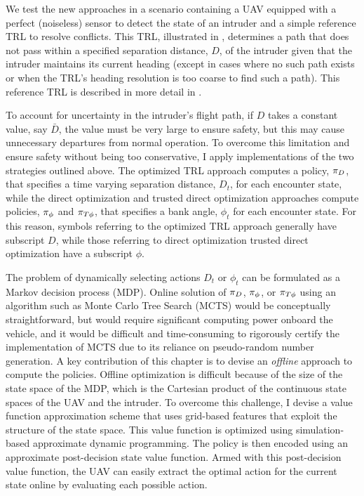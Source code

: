 We test the new approaches in a scenario containing a UAV equipped with a perfect (noiseless) sensor to detect the state of an intruder and a simple reference TRL to resolve conflicts. This TRL, illustrated in , determines a path that does not pass within a specified separation distance, $D$, of the intruder given that the intruder maintains its current heading (except in cases where no such path exists or when the TRL's heading resolution is too coarse to find such a path).
This reference TRL is described in more detail in .

To account for uncertainty in the intruder's flight path, if $D$ takes a constant value, say $\bar{D}$, the value must be very large to ensure safety, but this may cause unnecessary departures from normal operation.
To overcome this limitation and ensure safety without being too conservative, I apply implementations of the two strategies outlined above.
The optimized TRL approach computes a policy, ${\pi}_{D}$, that specifies a time varying separation distance, $D_t$, for each encounter state, while the direct optimization and trusted direct optimization approaches compute policies, ${\pi}_\phi$ and ${\pi}_{T\phi}$, that specifies a bank angle, $\phi_t$ for each encounter state.
For this reason, symbols referring to the optimized TRL approach generally have subscript $D$, while those referring to direct optimization trusted direct optimization have a subscript $\phi$.

The problem of dynamically selecting actions $D_t$ or $\phi_t$ can be formulated as a Markov decision process (MDP). Online solution of ${\pi}_{D}$, ${\pi}_\phi$, or ${\pi}_{T\phi}$ using an algorithm such as Monte Carlo Tree Search (MCTS) \cite{AC-JH-NS-OT-NB:11} would be conceptually straightforward, but would require significant computing power onboard the vehicle, and it would be difficult and time-consuming to rigorously certify the implementation of MCTS due to its reliance on pseudo-random number generation. A key contribution of this chapter is to devise an \emph{offline} approach to compute the policies. Offline optimization is difficult because of the size of the state space of the MDP, which is the Cartesian product of the continuous state spaces of the UAV and the intruder. To overcome this challenge, I devise a value function approximation scheme that uses grid-based features that exploit the structure of the state space. This value function is optimized using simulation-based approximate dynamic programming. The policy is then encoded using an approximate post-decision state value function. Armed with this post-decision value function, the UAV can easily extract the optimal action for the current state online by evaluating each possible action.


